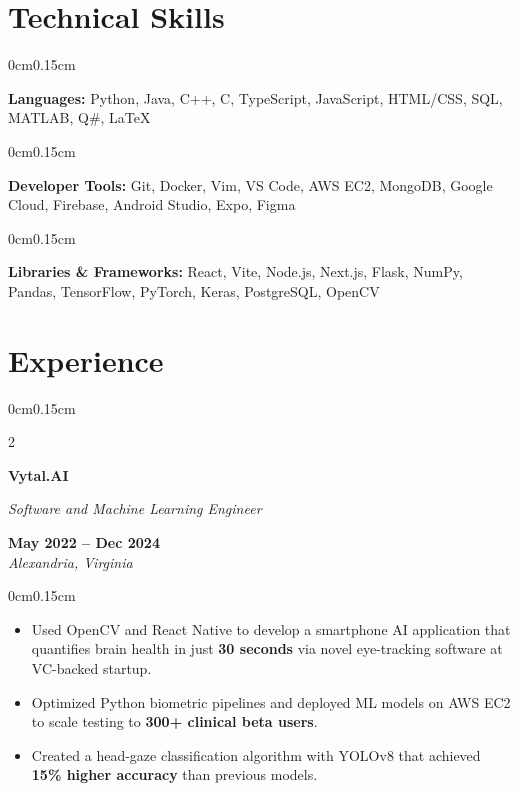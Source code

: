 \documentclass[10pt, letterpaper]{article}
\newenvironment{highlights}{
    \begin{itemize}[topsep=0pt, parsep=0pt, partopsep=0pt, itemsep=0pt, leftmargin=0.6cm]
}{
    \end{itemize}
}
\newenvironment{onecolentry}{
    \begin{adjustwidth}{0cm}{0.15cm}
}{
    \end{adjustwidth}
}
\newenvironment{twocolentry}[2][]{
    \onecolentry
    \def\secondColumn{#2}
    \setcolumnwidth{\fill, 4cm}
    \begin{paracol}{2}
}{
    \switchcolumn \raggedleft \secondColumn
    \end{paracol}
    \endonecolentry
}
\begin{document}
    \vspace{0.05cm}

    \section{Technical Skills}
    \vspace{0.1cm}

    \begin{onecolentry}
        \textbf{Languages:} Python, Java, C++, C, TypeScript, JavaScript, HTML/CSS, SQL, MATLAB, Q\#, LaTeX
    \end{onecolentry}
    \vspace{-0.1cm}
    \begin{onecolentry}
        \textbf{Developer Tools:} Git, Docker, Vim, VS Code, AWS EC2, MongoDB, Google Cloud, Firebase, Android Studio, Expo, Figma
    \end{onecolentry}
    \vspace{-0.1cm}
    \begin{onecolentry}
        \textbf{Libraries \& Frameworks:} React, Vite, Node.js, Next.js, Flask, NumPy, Pandas, TensorFlow, PyTorch, Keras, PostgreSQL, OpenCV
    \end{onecolentry}

    \vspace{0.05cm}

    \section{Experience}
    \vspace{0.1cm}

    \begin{twocolentry}{\textbf{May 2022 -- Dec 2024} \\ \textit{Alexandria, Virginia}}
        \textbf{Vytal.AI}
        
        \textit{Software and Machine Learning Engineer}
    \end{twocolentry}
    \vspace{-0.05cm}
    \begin{onecolentry}
        \begin{highlights}
            \item Used OpenCV and React Native to develop a smartphone AI application that quantifies brain health in just \textbf{30 seconds} via novel eye-tracking software at VC-backed startup.
            \item Optimized Python biometric pipelines and deployed ML models on AWS EC2 to scale testing to \textbf{300+ clinical beta users}.
            \item Created a head-gaze classification algorithm with YOLOv8 that achieved \textbf{15\% higher accuracy} than previous models.
        \end{highlights}
    \end{onecolentry}
\end{document}

